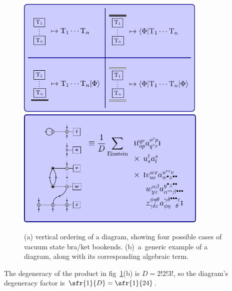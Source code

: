 \documentclass[11pt,fleqn]{article}
\numberwithin{equation}{section}
\begin{document}
\begin{figure}[h!]\label{fig:diagram-example}
\centering
\includegraphics[height=5.7cm]{figs/diagram-ordering.pdf}
\includegraphics[height=5.7cm]{figs/diagram-example.pdf}
\caption{(a) vertical ordering of a diagram, showing four possible cases of vacuum state bra/ket bookends.
(b)~a~generic example of a diagram, along with its corresponding algebraic term.}
\end{figure}

\begin{ex}
The degeneracy of the product in fig~\ref{fig:diagram-example}(b) is $D=2!2!3!$, so the diagram's degeneracy factor is $\sfr{1}{D}=\sfr{1}{24}$.
\end{ex}
\end{document}

